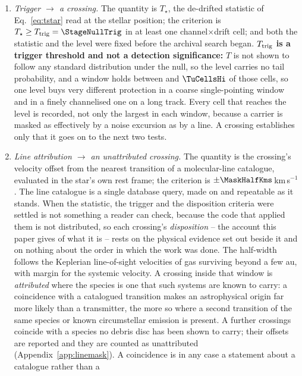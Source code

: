 \begin{enumerate}[label=(\roman*),leftmargin=1.9em,itemsep=3pt,topsep=3pt,parsep=0pt]
\item \emph{Trigger $\to$ a crossing.} The quantity is $T_\star$, the
de-drifted statistic of Eq.~\ref{eq:tstar} read at the stellar position; the
criterion is $T_\star\geq T_{\rm trig}=\StageNullTrig$ in at least one
channel$\times$drift cell; and both the statistic and the level were fixed
before the archival search began. \textbf{$T_{\rm trig}$ is a trigger
threshold and not a detection significance:} $T$ is not shown to follow any
standard distribution under the null, so the level carries no tail
probability, and a window holds between \TuCellsLo{} and $\TuCellsHi$ of
those cells, so one level buys very different protection in a coarse
single-pointing window and in a finely channelised one on a long track. Every
cell that reaches the level is recorded, not only the largest in each window,
because a carrier is masked as effectively by a noise excursion as by a line.
A crossing establishes only that it goes on to the next two tests.
\item \emph{Line attribution $\to$ an unattributed crossing.} The quantity
is the crossing's velocity offset from the nearest transition of a
molecular-line catalogue, evaluated in the star's own rest frame; the
criterion is $\pm\MaskHalfKms$\,km\,s$^{-1}$. The line catalogue is a
single database query, made on \MkListDate{} and repeatable as it stands.
When the statistic, the trigger and the disposition criteria were settled is
not something a reader can check, because the code that applied them is not
distributed, so each crossing's \emph{disposition} -- the account this paper
gives of what it is -- rests on the physical evidence set out beside it and
on nothing about the order in which the work was done. The half-width follows the Keplerian line-of-sight
velocities of gas
surviving beyond a few au, with margin for the systemic velocity. A crossing
inside that window is \emph{attributed} where the species is one that such
systems are known to carry: a coincidence with a catalogued transition makes
an astrophysical origin far more likely than a transmitter, the more so
where a second transition of the same species or known circumstellar
emission is present. A further \MkNSODecideWord{} crossings coincide with a
species no debris disc has been shown to carry; their offsets are reported
and they are counted as unattributed (Appendix~\ref{app:linemask}).
A coincidence is in any case a statement about a catalogue rather than a

\end{enumerate}
